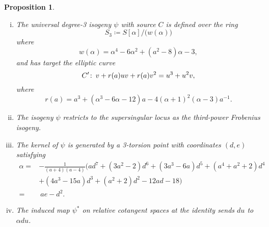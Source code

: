 \documentclass{gtpart}
\newtheorem{prop}[thm]{Proposition}
\theoremstyle{definition}
\theoremstyle{remark}
\def\co{\colon\thinspace}
\newcommand{\A}{\alpha}
\begin{document}
\begin{prop}
\label{prop:isog}
 \mbox{}
 \begin{enumerate}[(i)]
  \item The universal degree-3 isogeny $\psi$ with source $C$ is defined over the ring 
  \[
   S_3 \coloneqq S[\A] \big/ \big( w(\A) \big) 
  \]
  where 
  \[
   w(\A) = \A^4 - 6 \A^2 + (a^2 - 8) \A - 3, 
  \]
  and has target the elliptic curve 
  \[
   C' \co v + r(a) u v + r(a) v^2 = u^3 + u^2 v, 
  \]
  where 
  \[
   r(a) = a^3 + (\A^3 - 6 \A - 12) a - 4 (\A + 1)^2 (\A - 3) a^{-1}.  
  \]

  \item The isogeny $\psi$ restricts to the supersingular locus as the third-power Frobenius isogeny.  

  \item The kernel of $\psi$ is generated by a 3-torsion point with coordinates $(d,e)$ satisfying 
  \begin{equation*}
  \begin{split}
   \A = & -\frac{1}{(a + 4) (a - 4)} \big(a d^7 + (3 a^2 - 2) d^6 + (3 a^3 - 6 a) d^5 + (a^4 + a^2 + 2) d^4 \\
        & + (4 a^3 - 15 a) d^3 + (a^2 + 2) d^2 - 12 a d -18\big) \\
      = & ~ a e - d^2.  
  \end{split}
  \end{equation*}

  \item The induced map $\psi^*$ on relative cotangent spaces at the identity sends $du$ to $\A du$.  
 \end{enumerate}
\end{prop}
\end{document}
